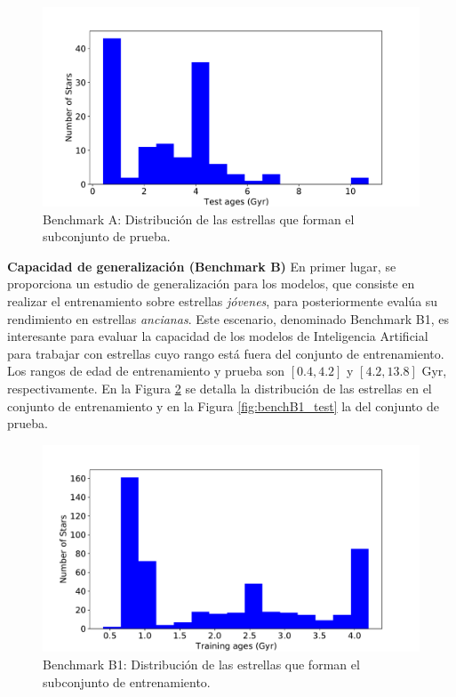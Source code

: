 \begin{figure}[H]
\begin{center}
 \includegraphics[width=0.8\linewidth]{Figuras/Experimentos/B_A_test.pdf}
\end{center}
\caption{Benchmark A: Distribución de las estrellas que forman el subconjunto de prueba.}
 \label{fig:benchA_test}
\end{figure}


\textbf{Capacidad de generalización (Benchmark B)} {} En primer lugar, se proporciona un estudio de generalización para los modelos, que consiste en realizar el entrenamiento  sobre estrellas \emph{jóvenes}, para posteriormente evalúa su rendimiento en estrellas \emph{ancianas}. Este escenario, denominado Benchmark B1, es interesante para evaluar la capacidad de los modelos de Inteligencia Artificial para trabajar con estrellas cuyo rango está fuera del conjunto de entrenamiento. Los rangos de edad de entrenamiento y prueba son $[0.4,4.2]$ y $[4.2,13.8]$ Gyr, respectivamente. En la Figura \ref{fig:benchB1_train} se detalla la distribución de las estrellas en el conjunto de entrenamiento y en la Figura \ref{fig:benchB1_test} la del conjunto de prueba.

\begin{figure}[H]
\begin{center}
 \includegraphics[width=0.8\linewidth]{Figuras/Experimentos/B_B1_training.pdf}
\end{center}
\caption{Benchmark B1: Distribución de las estrellas que forman el subconjunto de entrenamiento.}
 \label{fig:benchB1_train}
\end{figure}


